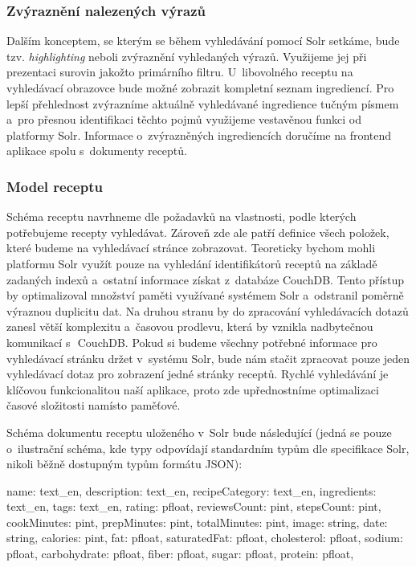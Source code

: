 \subsubsection{Zvýraznění nalezených výrazů}

Dalším konceptem, se kterým se během vyhledávání pomocí Solr setkáme, bude tzv. \emph{highlighting} neboli zvýraznění vyhledaných výrazů. Využijeme jej při prezentaci surovin jakožto primárního filtru. U~libovolného receptu na vyhledávací obrazovce bude možné zobrazit kompletní seznam ingrediencí. Pro lepší přehlednost zvýrazníme aktuálně vyhledávané ingredience tučným písmem a~pro přesnou identifikaci těchto pojmů využijeme vestavěnou funkci od platformy Solr. Informace o~zvýrazněných ingrediencích doručíme na frontend aplikace spolu s~dokumenty receptů.

\subsubsection{Model receptu}

Schéma receptu navrhneme dle požadavků na vlastnosti, podle kterých potřebujeme recepty vyhledávat. Zároveň zde ale patří definice všech položek, které budeme na vyhledávací stránce zobrazovat. Teoreticky bychom mohli platformu Solr využít pouze na vyhledání identifikátorů receptů na základě zadaných indexů a~ostatní informace získat z~databáze CouchDB. Tento přístup by optimalizoval množství paměti využívané systémem Solr a~odstranil poměrně výraznou duplicitu dat. Na druhou stranu by do zpracování vyhledávacích dotazů zanesl větší komplexitu a~časovou prodlevu, která by vznikla nadbytečnou komunikací s~\,CouchDB. Pokud si budeme všechny potřebné informace pro vyhledávací stránku držet v~systému Solr, bude nám stačit zpracovat pouze jeden vyhledávací dotaz pro zobrazení jedné stránky receptů. Rychlé vyhledávání je klíčovou funkcionalitou naší aplikace, proto zde upřednostníme optimalizaci časové složitosti namísto paměťové.

Schéma dokumentu receptu uloženého v~Solr bude následující (jedná se pouze o~ilustrační schéma, kde typy odpovídají standardním typům dle specifikace Solr, nikoli běžně dostupným typům formátu JSON):
\begin{code}
{
    name: text_en,
    description: text_en,
    recipeCategory: text_en,
    ingredients: text_en,
    tags: text_en,
    rating: pfloat,
    reviewsCount: pint,
    stepsCount: pint,
    cookMinutes: pint,
    prepMinutes: pint,
    totalMinutes: pint,
    image: string,
    date: string,
    calories: pint,
    fat: pfloat,
    saturatedFat: pfloat,
    cholesterol: pfloat,
    sodium: pfloat,
    carbohydrate: pfloat,
    fiber: pfloat,
    sugar: pfloat,
    protein: pfloat,
}
\end{code}

